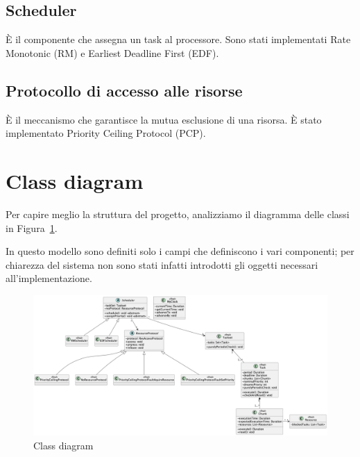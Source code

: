 \subsection{Scheduler}
È il componente che assegna un task al processore. Sono stati implementati Rate Monotonic (RM) e Earliest Deadline First (EDF).

\subsection{Protocollo di accesso alle risorse}
È il meccanismo che garantisce la mutua esclusione di una risorsa. È stato implementato Priority Ceiling Protocol (PCP).

\section{Class diagram}
Per capire meglio la struttura del progetto, analizziamo il diagramma delle classi in Figura~\ref{fig:classDiagram}.

In questo modello sono definiti solo i campi che definiscono i vari componenti; per chiarezza del sistema non sono stati infatti introdotti gli oggetti necessari all'implementazione.
\begin{figure}[htbp]
    \centering
    \includegraphics[width=1\textwidth]{immagini/class diagram.pdf}
    \caption{Class diagram}
    \label{fig:classDiagram}
\end{figure}